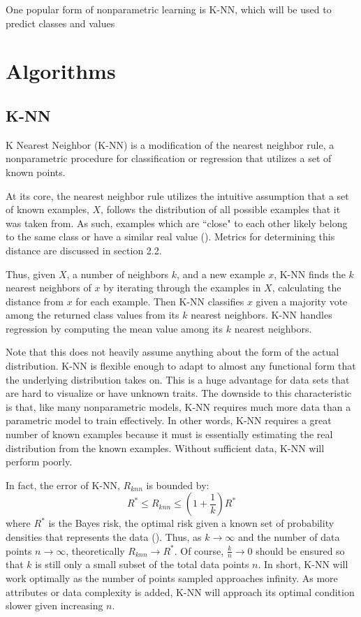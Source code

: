 \documentclass[twoside,11pt]{article}
\begin{document}
One popular form of nonparametric learning is K-NN, which will be used to predict classes and values 

\section{Algorithms}

\subsection{K-NN}

K Nearest Neighbor (K-NN) is a modification of the nearest neighbor rule, a nonparametric procedure for classification or regression that utilizes a set of known points.

At its core, the nearest neighbor rule utilizes the intuitive assumption that a set of known examples, $X$, follows the distribution of all possible examples that it was taken from. As such, examples which are ``close" to each other likely belong to the same class or have a similar real value (\cite{NNClassification}). Metrics for determining this distance are discussed in section 2.2.

Thus, given $X$, a number of neighbors $k$, and a new example $x$, K-NN finds the $k$ nearest neighbors of $x$ by iterating through the examples in $X$, calculating the distance from $x$ for each example. Then K-NN classifies $x$ given a majority vote among the returned class values from its $k$ nearest neighbors. K-NN handles regression by computing the mean value among its $k$ nearest neighbors.

Note that this does not heavily assume anything about the form of the actual distribution. K-NN is flexible enough to adapt to almost any functional form that the underlying distribution takes on. This is a huge advantage for data sets that are hard to visualize or have unknown traits. The downside to this characteristic is that, like many nonparametric models, K-NN requires much more data than a parametric model to train effectively. In other words, K-NN requires a great number of known examples because it must is essentially estimating the real distribution from the known examples. Without sufficient data, K-NN will perform poorly.

In fact, the error of K-NN, $R_{knn}$ is bounded by:
$$R^* \leq R_{knn} \leq (1+\frac{1}{k})R^*$$ 
where $R^*$ is the Bayes risk, the optimal risk given a known set of probability densities that represents the data (\cite{NNClassification}). Thus, as $k \rightarrow \infty$ and the number of data points $n \rightarrow \infty$, theoretically $R_{knn} \rightarrow R^*$. Of course, $\frac{k}{n} \rightarrow 0$ should be ensured so that $k$ is still only a small subset of the total data points $n$. In short, K-NN will work optimally as the number of points sampled approaches infinity. As more attributes or data complexity is added, K-NN will approach its optimal condition slower given increasing $n$.
\end{document}
